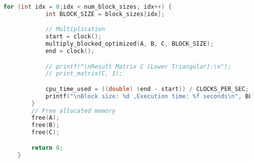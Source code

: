\documentclass[14pt, russian]{matmex-diploma-custom}
\begin{document}
{\begin{lstlisting}[language=C, caption={Приложение 1D массивов с блочной оптимизацией}]
        for (int idx = 0;idx < num_block_sizes; idx++) {
            int BLOCK_SIZE = block_sizes[idx];

            // Multiplication
            start = clock();
            multiply_blocked_optimized(A, B, C, BLOCK_SIZE);
            end = clock();

            // printf("\nResult Matrix C (Lower Triangular):\n");
            // print_matrix(C, 1);

            cpu_time_used = ((double) (end - start)) / CLOCKS_PER_SEC;
            printf("\nBlock size: %d ,Execution time: %f seconds\n", BLOCK_SIZE, cpu_time_used);
        }
        // Free allocated memory
        free(A);
        free(B);
        free(C);

        return 0;
    }

\end{lstlisting}
}
\end{document}
